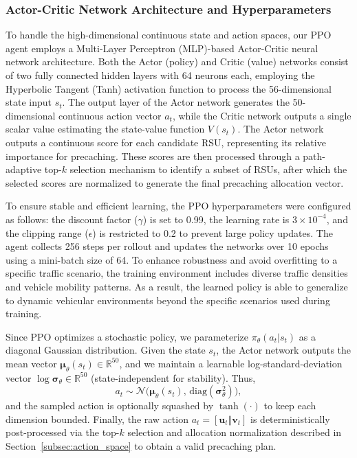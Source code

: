 \subsubsection{Actor-Critic Network Architecture and Hyperparameters} \label{subsec:ppo_hyper}
To handle the high-dimensional continuous state and action spaces, our PPO agent employs a Multi-Layer Perceptron (MLP)-based Actor-Critic neural network architecture. Both the Actor (policy) and Critic (value) networks consist of two fully connected hidden layers with 64 neurons each, employing the Hyperbolic Tangent (Tanh) activation function to process the 56-dimensional state input $s_t$. The output layer of the Actor network generates the 50-dimensional continuous action vector $a_t$, while the Critic network outputs a single scalar value estimating the state-value function $V(s_t)$. The Actor network outputs a continuous score for each candidate RSU, representing its relative importance for precaching. 
These scores are then processed through a path-adaptive top-$k$ selection mechanism to identify a subset of RSUs, after which the selected scores are normalized to generate the final precaching allocation vector.



To ensure stable and efficient learning, the PPO hyperparameters were configured as follows: the discount factor ($\gamma$) is set to 0.99, the learning rate is $3 \times 10^{-4}$, and the clipping range ($\epsilon$) is restricted to 0.2 to prevent large policy updates. The agent collects 256 steps per rollout and updates the networks over 10 epochs using a mini-batch size of 64. 
To enhance robustness and avoid overfitting to a specific traffic scenario, the training environment includes diverse traffic densities and vehicle mobility patterns. 
As a result, the learned policy is able to generalize to dynamic vehicular environments beyond the specific scenarios used during training.

Since PPO optimizes a stochastic policy, we parameterize $\pi_\theta(a_t|s_t)$ as a diagonal Gaussian distribution. 
Given the state $s_t$, the Actor network outputs the mean vector $\boldsymbol{\mu}_\theta(s_t)\in\mathbb{R}^{50}$, and we maintain a learnable log-standard-deviation vector $\log\boldsymbol{\sigma}_\theta\in\mathbb{R}^{50}$ (state-independent for stability). 
Thus,
\begin{equation}
a_t \sim \mathcal{N}\!\big(\boldsymbol{\mu}_\theta(s_t),\,\mathrm{diag}(\boldsymbol{\sigma}_\theta^2)\big),
\end{equation}
and the sampled action is optionally squashed by $\tanh(\cdot)$ to keep each dimension bounded. 
Finally, the raw action $a_t=[\mathbf{u}_t\Vert\mathbf{v}_t]$ is deterministically post-processed via the top-$k$ selection and allocation normalization described in Section~\ref{subsec:action_space} to obtain a valid precaching plan.


